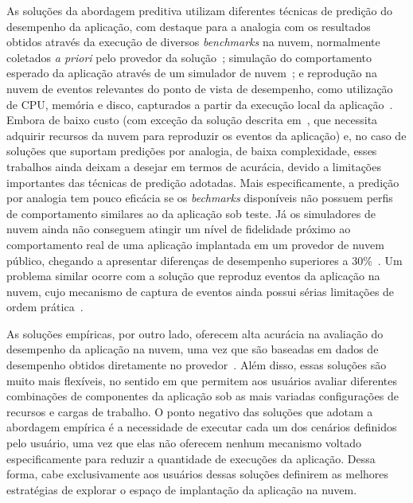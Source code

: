 \documentclass[10pt,conference,compsocconf]{IEEEtran}
\begin{document}

As soluções da abordagem preditiva utilizam diferentes técnicas de predição do desempenho da aplicação, com destaque para a analogia com os resultados obtidos através da execução de diversos {\em benchmarks} na nuvem, normalmente coletados {\em a priori} pelo provedor da solução~\cite{malkowski2010cloudxplor,cloudharmony,li2011,jung2013cloudadvisor}; simulação do comportamento esperado da aplicação através de um simulador de nuvem~\cite{fittkau2012cdosim}; e reprodução na nuvem de eventos relevantes do ponto de vista de desempenho, como utilização de CPU, memória e disco, capturados a partir da execução local da aplicação~\cite{li2011cloudprophet}. Embora de baixo custo (com
exceção da solução descrita em~\cite{li2011cloudprophet}, que necessita adquirir recursos da nuvem para reproduzir os eventos da aplicação) e, no caso de soluções que suportam predições por analogia, de baixa complexidade, esses trabalhos ainda deixam a desejar em termos de acurácia, devido a limitações importantes das técnicas de predição adotadas. Mais especificamente, a predição por analogia tem pouco eficácia se os {\em bechmarks} disponíveis não possuem perfis de comportamento similares ao da aplicação sob teste. Já os simuladores de nuvem ainda não conseguem atingir um nível de fidelidade próximo ao comportamento real de uma aplicação implantada em um provedor de nuvem público, chegando a apresentar diferenças de desempenho superiores a 30\%~\cite{fittkau2012cdosim}. Um problema similar ocorre com a solução que reproduz eventos da aplicação na nuvem, cujo mecanismo de captura de eventos ainda possui sérias limitações de ordem prática~\cite{li2011cloudprophet}.

As soluções empíricas, por outro lado, oferecem alta acurácia na avaliação do desempenho da aplicação na nuvem, uma vez que são baseadas em dados de desempenho obtidos diretamente no provedor~\cite{jayasinghe2012,silva2013cloudbench,cunha2013b,scheuner2014cloud}. Além disso, essas soluções são muito mais flexíveis, no sentido em que permitem aos usuários avaliar diferentes combinações de componentes da aplicação sob as mais variadas configurações de recursos e cargas de trabalho. O ponto negativo das soluções que adotam a abordagem empírica é a necessidade de executar cada um dos cenários definidos pelo usuário, uma vez que elas não oferecem nenhum mecanismo voltado especificamente para reduzir a quantidade de execuções da aplicação. Dessa forma, cabe exclusivamente aos usuários dessas soluções definirem as melhores estratégias de explorar o espaço de implantação da aplicação na nuvem.
\end{document}
